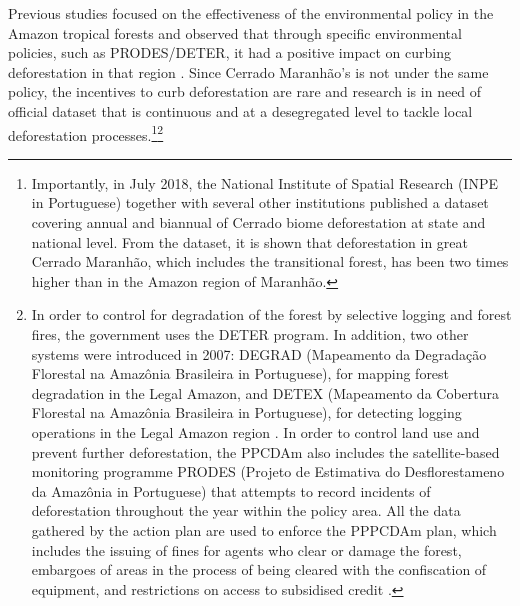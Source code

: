 Previous studies focused on the effectiveness of the environmental policy in the Amazon tropical forests and observed that through specific environmental policies, such as PRODES/DETER, it had a positive impact on curbing deforestation in that region \citep{nepstad2_2014, NEPSTAD, RICHARDS, RICHARDS2, CELENTANO_2017}. Since Cerrado Maranhão's is not under the same policy, the incentives to curb deforestation are rare and research is in need of official dataset that is continuous and at a desegregated level to tackle local deforestation processes.\footnote{Importantly, in July 2018, the National Institute of Spatial Research (INPE in Portuguese) together with several other institutions published a dataset covering annual and biannual of Cerrado biome deforestation at state and national level. From the dataset, it is shown that deforestation in great Cerrado Maranhão, which includes the transitional forest, has been two times higher than in the Amazon region of Maranhão.}\footnote{In order to control for degradation of the forest by selective logging and forest fires, the government uses the DETER program. In addition, two other systems were introduced in 2007: DEGRAD (Mapeamento da Degradaç\~{a}o Florestal na Amaz\^{o}nia Brasileira in Portuguese), for mapping forest degradation in the Legal Amazon, and DETEX (Mapeamento da Cobertura Florestal na Amaz\^{o}nia Brasileira in Portuguese), for detecting logging operations in the Legal Amazon region \citep{VALERIANO}. In order to control land use and prevent further deforestation, the PPCDAm  also includes the satellite-based monitoring programme PRODES (Projeto de Estimativa do Desflorestameno da Amaz\^{o}nia in Portuguese) \citep{inpe} that attempts to record incidents of deforestation throughout the year within the policy area. All the data gathered by the action plan are used to enforce the PPPCDAm plan, which includes the issuing of fines for agents who clear or damage the forest, embargoes of areas in the process of being cleared with the confiscation of equipment, and restrictions on access to subsidised credit \citep{AUBERTIN}.} 


